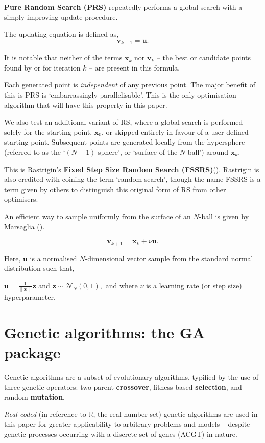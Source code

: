 \documentclass[
  a4paper,
  DIV=11,
  numbers=noendperiod]{scrartcl}
\newcommand{\B}[1]{\boldsymbol{#1}}
\newcommand{\+}{\phantom{-}}
\begin{document}
\textbf{Pure Random Search (PRS)} repeatedly performs a global search
with a simply improving update procedure.

The updating equation is defined as, \[\B v_{k+1} = \B u.\]

It is notable that neither of the terms \(\B x_k\) nor \(\B v_k\) -- the
best or candidate points found by or for iteration \(k\) -- are present
in this formula.

Each generated point is \emph{independent} of any previous point. The
major benefit of this is PRS is `embarrassingly parallelisable'. This is
the only optimisation algorithm that will have this property in this
paper.

We also test an additional variant of RS, where a global search is
performed solely for the starting point, \(\B x_0\), or skipped entirely
in favour of a user-defined starting point. Subsequent points are
generated locally from the hypersphere (referred to as the
`\(\left(N-1\right)\)-sphere', or `surface of the \(N\)-ball') around
\(\B x_k\).

This is Rastrigin's \textbf{Fixed Step Size Random Search
(FSSRS)}(). Rastrigin is
also credited with coining the term `random search', though the name
FSSRS is a term given by others to distinguish this original form of RS
from other optimisers.

An efficient way to sample uniformly from the surface of an \(N\)-ball
is given by Marsaglia ().

\[\B v_{k+1} = \B x_k +\nu \B u.\]

Here, \(\B u\) is a normalised \(N\)-dimensional vector sample from the
standard normal distribution such that,

\(\B u = \frac1{\lVert \B z \rVert}\B z\) and
\(\B z \sim \mathcal{N}_N\left(0,1\right),\) and where \(\nu\) is a
learning rate (or step size) hyperparameter.

\section{Genetic algorithms: the GA
package}\label{genetic-algorithms-the-ga-package}

Genetic algorithms are a subset of evolutionary algorithms, typified by
the use of three genetic operators: two-parent \textbf{crossover},
fitness-based \textbf{selection}, and random \textbf{mutation}.

\emph{Real-coded} (in reference to \(\mathbb R\), the real number set)
genetic algorithms are used in this paper for greater applicability to
arbitrary problems and models -- despite genetic processes occurring
with a discrete set of genes (ACGT) in nature.
\end{document}

